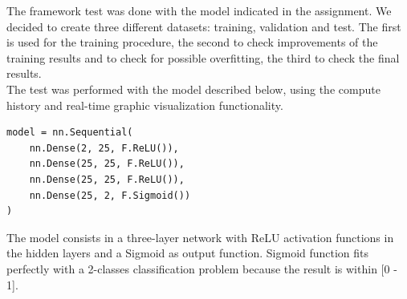 The framework test was done with the model indicated in the assignment. We decided to create three different datasets: training, validation and test. The first is used for the training procedure, the second to check improvements of the training results and to check for possible overfitting, the third to check the final results. \\
The test was performed with the model described below, using the compute history and real-time graphic visualization functionality.
\begin{verbatim}
model = nn.Sequential(
	nn.Dense(2, 25, F.ReLU()),
	nn.Dense(25, 25, F.ReLU()),
	nn.Dense(25, 25, F.ReLU()),
	nn.Dense(25, 2, F.Sigmoid())
)  
\end{verbatim}
The model consists in a three-layer network with ReLU activation functions in the hidden layers and a Sigmoid as output function. Sigmoid function fits perfectly with a 2-classes classification problem because the result is within [0 - 1]. 

